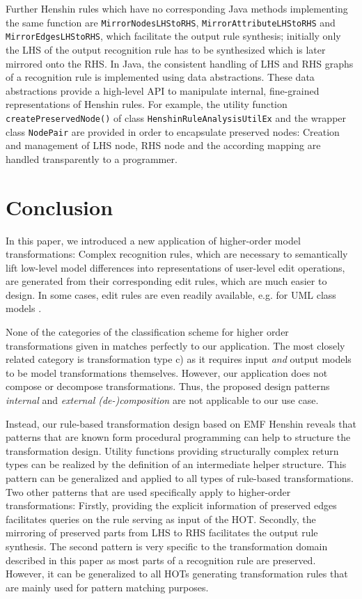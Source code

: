 \documentclass{llncs}
\begin{document}
Further Henshin rules which have no corresponding Java methods implementing the same function are
\texttt{MirrorNodesLHStoRHS},
\texttt{MirrorAttributeLHStoRHS} and
\texttt{MirrorEdgesLHStoRHS}, which facilitate the output rule
synthesis; initially only the LHS
of the output recognition rule has to be synthesized which is later mirrored onto
the RHS. In Java, the consistent handling of LHS and RHS graphs of a 
recognition rule is implemented using data abstractions. 
These data abstractions provide a high-level API to manipulate 
internal, fine-grained representations of Henshin rules. For example, 
the utility function \texttt{createPreservedNode()} of class 
\texttt{HenshinRuleAnalysisUtilEx} and the wrapper class \texttt{NodePair} are provided 
in order to encapsulate preserved nodes: Creation and 
management of LHS node, RHS node and the according mapping 
are handled transparently to a programmer.



\section{Conclusion}
\label{sec:conclusion}
In this paper, we introduced a new application of higher-order
model transformations: Complex recognition rules, which are necessary to
semantically lift low-level model differences into representations
of user-level edit operations, are generated from their corresponding
edit rules, which are much easier to design. In some cases,
edit rules are even readily available, e.g. for UML class
models \cite{RiKKP11TechRep}.

None of the categories of the classification scheme 
for higher order transformations given in \cite{TiJFCB2009ECMDA} matches
perfectly to our application. The most closely related
category is transformation type c) as it requires
input \textit{and} output models to be model transformations themselves.
However, our application does not compose or decompose transformations.
Thus, the proposed design patterns \textit{internal} and \textit{external (de-)composition}
are not applicable to our use case. 

Instead, our rule-based transformation design based on EMF Henshin
reveals that patterns that are known form procedural programming
can help to structure the transformation design.
Utility functions providing structurally complex return types 
can be realized by the definition of an intermediate helper 
structure. This pattern can be generalized and applied to all
types of rule-based transformations. 
Two other patterns that are used specifically apply to
higher-order transformations: Firstly, providing the explicit 
information of preserved edges facilitates queries on the 
rule serving as input of the HOT. Secondly, the mirroring of preserved parts from LHS to RHS facilitates the output rule synthesis. The second pattern is very specific to the transformation domain described in this paper as most parts of a recognition rule are preserved. However, it can be generalized to all HOTs generating transformation rules that are mainly used for pattern matching purposes.
\end{document}
